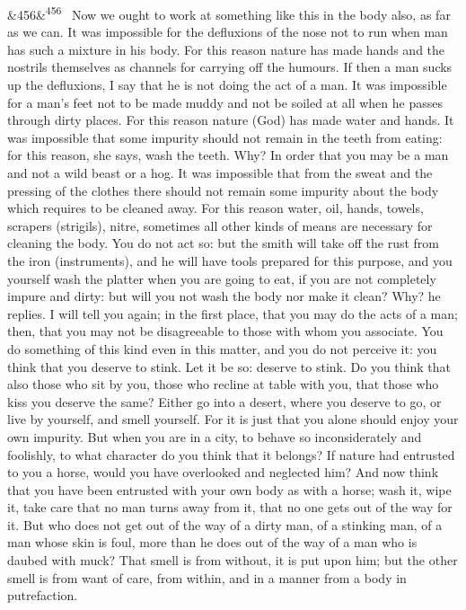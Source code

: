 \documentclass[12pt]{article}
\newcommand{\para}[1][]{\par\noindent\ifx&#1&\else\textsuperscript{\footnotesize #1}~\fi}
\begin{document}
\para[456] Now we ought to work at something like this in the body also, as far as we can. It was impossible for the defluxions of the nose not to run when man has such a mixture in his body. For this reason nature has made hands and the nostrils themselves as channels for carrying off the humours. If then a man sucks up the defluxions, I say that he is not doing the act of a man. It was impossible for a man's feet not to be made muddy and not be soiled at all when he passes through dirty places. For this reason nature (God) has made water and hands. It was impossible that some impurity should not remain in the teeth from eating: for this reason, she says, wash the teeth. Why? In order that you may be a man and not a wild beast or a hog. It was impossible that from the sweat and the pressing of the clothes there should not remain some impurity about the body which requires to be cleaned away. For this reason water, oil, hands, towels, scrapers (strigils), nitre, sometimes all other kinds of means are necessary for cleaning the body. You do not act so: but the smith will take off the rust from the iron (instruments), and he will have tools prepared for this purpose, and you yourself wash the platter when you are going to eat, if you are not completely impure and dirty: but will you not wash the body nor make it clean? Why? he replies. I will tell you again; in the first place, that you may do the acts of a man; then, that you may not be disagreeable to those with whom you associate. You do something of this kind even in this matter, and you do not perceive it: you think that you deserve to stink. Let it be so: deserve to stink. Do you think that also those who sit by you, those who recline at table with you, that those who kiss you deserve the same? Either go into a desert, where you deserve to go, or live by yourself, and smell yourself. For it is just that you alone should enjoy your own impurity. But when you are in a city, to behave so inconsiderately and foolishly, to what character do you think that it belongs? If nature had entrusted to you a horse, would you have overlooked and neglected him? And now think that you have been entrusted with your own body as with a horse; wash it, wipe it, take care that no man turns away from it, that no one gets out of the way for it. But who does not get out of the way of a dirty man, of a stinking man, of a man whose skin is foul, more than he does out of the way of a man who is daubed with muck? That smell is from without, it is put upon him; but the other smell is from want of care, from within, and in a manner from a body in putrefaction.
\end{document}
